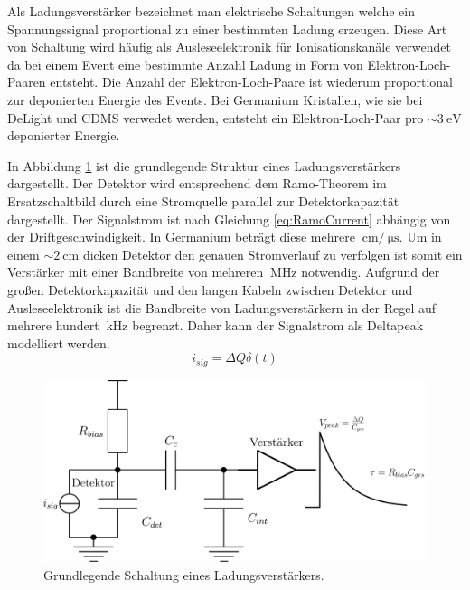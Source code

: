 Als Ladungsverstärker bezeichnet man elektrische Schaltungen welche ein Spannungssignal proportional zu einer bestimmten Ladung erzeugen.
Diese Art von Schaltung wird häufig als Ausleseelektronik für Ionisationskanäle verwendet da bei einem Event eine bestimmte Anzahl Ladung in Form von Elektron-Loch-Paaren entsteht.
Die Anzahl der Elektron-Loch-Paare ist wiederum proportional zur deponierten Energie des Events.
Bei Germanium Kristallen, wie sie bei DeLight und CDMS verwedet werden, entsteht ein Elektron-Loch-Paar pro $\sim\SI{3}{\electronvolt}$ deponierter Energie.

In Abbildung \ref{fig:Ladungsverstärker} ist die grundlegende Struktur eines Ladungsverstärkers dargestellt.
Der Detektor wird entsprechend dem Ramo-Theorem im Ersatzschaltbild durch eine Stromquelle parallel zur Detektorkapazität dargestellt.
Der Signalstrom ist nach Gleichung \eqref{eq:RamoCurrent} abhängig von der Driftgeschwindigkeit.
In Germanium beträgt diese mehrere $\SI{}{\centi\meter}/\SI{}{\micro\second}$.
Um in einem $\sim\SI{2}{\centi\meter}$ dicken Detektor den genauen Stromverlauf zu verfolgen ist somit ein Verstärker mit einer Bandbreite von mehreren $\SI{}{\mega\hertz}$ notwendig.
Aufgrund der großen Detektorkapazität und den langen Kabeln zwischen Detektor und Ausleseelektronik ist die Bandbreite von Ladungsverstärkern in der Regel auf mehrere hundert $\SI{}{\kilo\hertz}$ begrenzt.
Daher kann der Signalstrom als Deltapeak modelliert werden.
\begin{equation}
i_{sig} = \Delta Q \delta(t)
\end{equation}

\begin{figure}[!t]
\begin{center}
\includegraphics[scale=0.35]{./fig/Ladungsverstaerker.pdf}
\vspace{-0.5cm}
\caption{Grundlegende Schaltung eines Ladungsverstärkers.}
\label{fig:Ladungsverstärker}
\end{center}
\end{figure}

